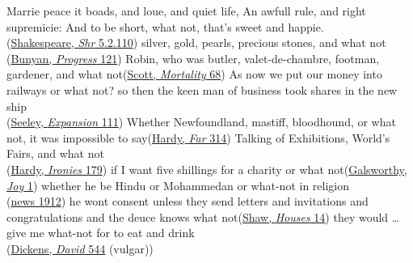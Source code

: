 \ea \label{ex:04-29}
\ea
Marrie peace it boads, and loue, and quiet life, An awfull rule, and right supremicie: And to be short, what not, that's sweet and happie.\\\hfill(\href{https://internetshakespeare.uvic.ca/doc/Shr_F1/scene/5.2/index.html#tln-2660}{Shakespeare, \textit{Shr} 5.2.110}) %
\ex
 silver, gold, pearls, precious stones, and what not\\\hfill(\href{https://archive.org/details/bunyanspilgrims00moffgoog/page/116/mode/2up?q=\%22precious+stones\%22&view=theater}{Bunyan, \textit{Progress} 121}) %
\ex
Robin, who was butler, valet-de-chambre, footman, gardener, and what not\hfill(\href{https://archive.org/details/talesmylandlord09scotgoog/page/n180/mode/2up?q=\%22Robin%2C+who+was+butler\%22&view=theater}{Scott, \textit{Mortality} 68}) %
\ex
As now we put our money into railways or what not? so then the keen man of business took shares in the new ship\\\hfill(\href{https://archive.org/details/ourcolonialexpan00seel/page/58/mode/2up?q=\%22what+not\%22&view=theater}{Seeley, \textit{Expansion} 111})
\ex
Whether Newfoundland, mastiff, bloodhound, or what not, it was impossible to say\hfill(\href{https://archive.org/details/farfrommaddingcr0000thom_h4k2/page/250/mode/2up?q=\%22what+not\%22&view=theater}{Hardy, \textit{Far} 314})
\ex
Talking of Exhibitions, World's Fairs, and what not\\\hfill(\href{https://archive.org/details/lifeslittleironi00harduoft/page/152/mode/2up?q=\%22what+not\%22&view=theater}{Hardy, \textit{Ironies} 179})
\ex
if I want five shillings for a charity or what not\hfill(\href{https://archive.org/details/joyplayonletteri00gals/page/106/mode/2up?q=\%22what+not\%22&view=theater}{Galsworthy, \textit{Joy} 1}) %
\ex
whether he be Hindu or Mohammedan or what-not in religion\\\hfill(\href{https://archive.org/details/worldswork24gard/page/640/mode/2up?q=\%22or+what-not+in+religion\%22&view=theater}{news 1912})
\ex
he wont consent unless they send letters and invitations and congratulations and the deuce knows what not\hfill(\href{https://archive.org/details/widowershousesun00shaw/page/18/mode/2up?q=\%22+what+not\%22&view=theater}{Shaw, \textit{Houses} 14})
\ex
they would {\dots} give me what-not for to eat and drink\\\hfill(\href{https://archive.org/details/personalhistory05dickgoog/page/n239/mode/2up?q=\%22what-not\%22&view=theater}{Dickens, \textit{David} 544} (vulgar)) %
\z
\z

